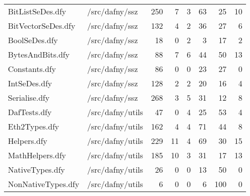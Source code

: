 \documentclass[a4paper, 12pt]{article}
\begin{document}
\begin{tabular}{llrrrrrr}
               BitListSeDes.dfy &                                  /src/dafny/ssz &   250 &         7 &                3 &             63 &             25 &      10 \\
             BitVectorSeDes.dfy &                                  /src/dafny/ssz &   132 &         4 &                2 &             36 &             27 &       6 \\
                  BoolSeDes.dfy &                                  /src/dafny/ssz &    18 &         0 &                2 &              3 &             17 &       2 \\
               BytesAndBits.dfy &                                  /src/dafny/ssz &    88 &         7 &                6 &             44 &             50 &      13 \\
                  Constants.dfy &                                  /src/dafny/ssz &    86 &         0 &                0 &             23 &             27 &       0 \\
                   IntSeDes.dfy &                                  /src/dafny/ssz &   128 &         2 &                2 &             20 &             16 &       4 \\
                  Serialise.dfy &                                  /src/dafny/ssz &   268 &         3 &                5 &             31 &             12 &       8 \\
                   DafTests.dfy &                                /src/dafny/utils &    47 &         0 &                4 &             25 &             53 &       4 \\
                  Eth2Types.dfy &                                /src/dafny/utils &   162 &         4 &                4 &             71 &             44 &       8 \\
                    Helpers.dfy &                                /src/dafny/utils &   229 &        11 &                4 &             69 &             30 &      15 \\
                MathHelpers.dfy &                                /src/dafny/utils &   185 &        10 &                3 &             31 &             17 &      13 \\
                NativeTypes.dfy &                                /src/dafny/utils &    26 &         0 &                0 &             13 &             50 &       0 \\
             NonNativeTypes.dfy &                                /src/dafny/utils &     6 &         0 &                0 &              6 &            100 &       0 \\

\end{tabular}
\end{document}
